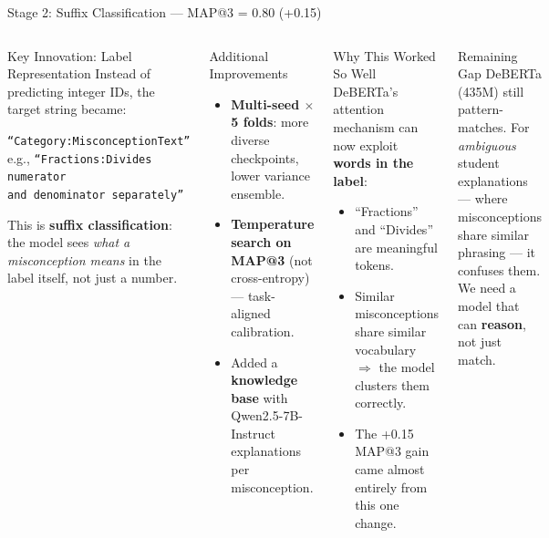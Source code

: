﻿\documentclass[aspectratio=169,10pt]{beamer}
\begin{document}
\begin{frame}[shrink=4]{Stage 2: Suffix Classification --- MAP@3 = 0.80 \texorpdfstring{(+0.15)}{}}
\begin{columns}[T]
\begin{block}{Key Innovation: Label Representation}
Instead of predicting integer IDs, the target string became:
\begin{center}
\texttt{``Category:MisconceptionText''}\\[4pt]
e.g., \texttt{``Fractions:Divides numerator}\\
\texttt{and denominator separately''}
\end{center}
This is \textbf{suffix classification}: the model sees \textit{what a misconception means} in the label itself, not just a number.
\end{block}
\vspace{6pt}
\begin{block}{Additional Improvements}
\begin{itemize}
  \item \textbf{Multi-seed $\times$ 5 folds}: more diverse checkpoints, lower variance ensemble.
  \item \textbf{Temperature search on MAP@3} (not cross-entropy) --- task-aligned calibration.
  \item Added a \textbf{knowledge base} with Qwen2.5-7B-Instruct explanations per misconception.
\end{itemize}
\end{block}
\begin{exampleblock}{Why This Worked So Well}
DeBERTa's attention mechanism can now exploit \textbf{words in the label}:
\begin{itemize}
  \item ``Fractions'' and ``Divides'' are meaningful tokens.
  \item Similar misconceptions share similar vocabulary $\Rightarrow$ the model clusters them correctly.
  \item The +0.15 MAP@3 gain came almost entirely from this one change.
\end{itemize}
\end{exampleblock}
\vspace{6pt}
\begin{alertblock}{Remaining Gap}
DeBERTa (435M) still pattern-matches. For \textit{ambiguous} student explanations --- where misconceptions share similar phrasing --- it confuses them. We need a model that can \textbf{reason}, not just match.
\end{alertblock}
\end{columns}
\end{frame}
\end{document}
